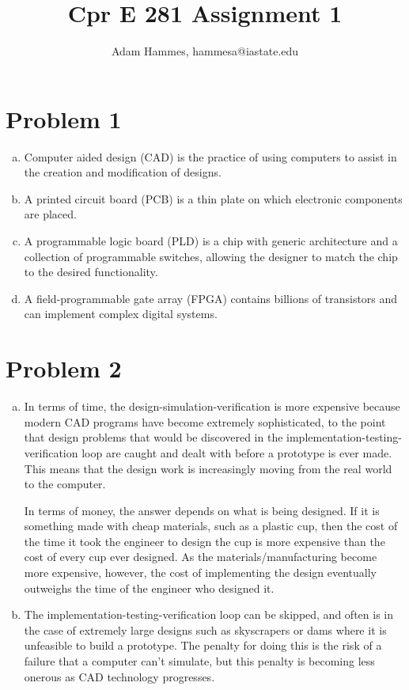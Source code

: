 \documentclass[11pt]{article}
\begin{document}
\title{Cpr E 281 Assignment 1}
\author{Adam Hammes, hammesa@iastate.edu}
\maketitle

\section*{Problem 1}
	\begin{enumerate}[(a)]
	\item
		Computer aided design (CAD) is the practice of using computers to assist in 
		the creation and modification of designs.
		
	\item
		A printed circuit board (PCB) is a thin plate on which electronic components 		
		are placed.
		
	\item
		A programmable logic board (PLD) is a chip with generic architecture and a 
		collection of programmable switches, allowing the designer to match the chip 
		to the desired functionality.
		
	\item
		A field-programmable gate array (FPGA) contains billions of transistors and can 
		implement complex digital systems.
		
	\end{enumerate}
		
\section*{Problem 2}
	\begin{enumerate}[(a)]
	\item 
		In terms of time, the design-simulation-verification is more expensive because modern CAD programs have become extremely sophisticated, to the point that design problems that would be discovered in the implementation-testing-verification loop are caught and dealt with before a prototype is ever made. This means that the design work is increasingly moving from the real world to the computer.
		
		In terms of money, the answer depends on what is being designed. If it is something made with cheap materials, such as a plastic cup, then the cost of the time it took the engineer to design the cup is more expensive than the cost of every cup ever designed. As the materials/manufacturing become more expensive, however, the cost of implementing the design eventually outweighs the time of the engineer who designed it.
		
		\item The implementation-testing-verification loop can be skipped, and often is in the case of extremely large designs such as skyscrapers or dams where it is unfeasible to build a prototype. The penalty for doing this is the risk of a failure that a computer can't simulate, but this penalty is becoming less onerous as CAD technology progresses.

	\end{enumerate}
\end{document}

